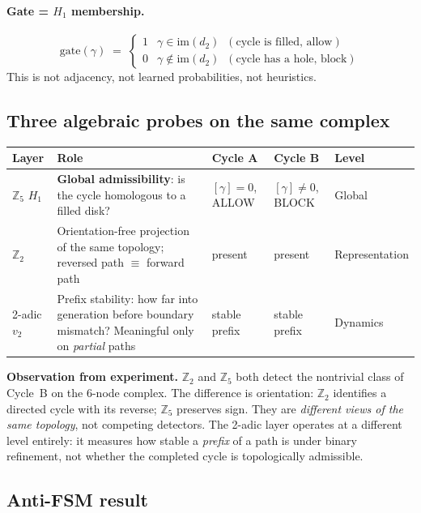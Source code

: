 \documentclass[11pt,a4paper]{article}
\begin{document}
\paragraph{Gate = $H_1$ membership.}
\[
\mathrm{gate}(\gamma) \;=\;
\begin{cases}
1 & \gamma \in \mathrm{im}(d_2) \;\;(\text{cycle is filled, allow}) \\
0 & \gamma \notin \mathrm{im}(d_2) \;\;(\text{cycle has a hole, block})
\end{cases}
\]
This is not adjacency, not learned probabilities, not heuristics.

\subsection{Three algebraic probes on the same complex}

\begin{center}
\renewcommand{\arraystretch}{1.3}\small
\begin{tabular}{p{2.0cm}p{3.8cm}p{2.2cm}p{2.2cm}p{2.2cm}}
\toprule
\textbf{Layer} & \textbf{Role} & \textbf{Cycle A} & \textbf{Cycle B}
  & \textbf{Level} \\
\midrule
$\mathbb{Z}_5$ $H_1$ &
  \textbf{Global admissibility}: is the cycle homologous to a filled disk? &
  $[\gamma]=0$, ALLOW &
  $[\gamma]\neq 0$, BLOCK &
  Global \\
$\mathbb{Z}_2$ &
  Orientation-free projection of the same topology; reversed path $\equiv$ forward path &
  present &
  present &
  Representation \\
2-adic $v_2$ &
  Prefix stability: how far into generation before boundary mismatch?
  Meaningful only on \emph{partial} paths &
  stable prefix &
  stable prefix &
  Dynamics \\
\bottomrule
\end{tabular}
\end{center}

\noindent
\textbf{Observation from experiment.}
$\mathbb{Z}_2$ and $\mathbb{Z}_5$ both detect the nontrivial class of
Cycle~B on the 6-node complex.
The difference is orientation: $\mathbb{Z}_2$ identifies a directed
cycle with its reverse; $\mathbb{Z}_5$ preserves sign.
They are \emph{different views of the same topology}, not competing detectors.
The 2-adic layer operates at a different level entirely: it measures
how stable a \emph{prefix} of a path is under binary refinement,
not whether the completed cycle is topologically admissible.

\subsection{Anti-FSM result}
\end{document}

